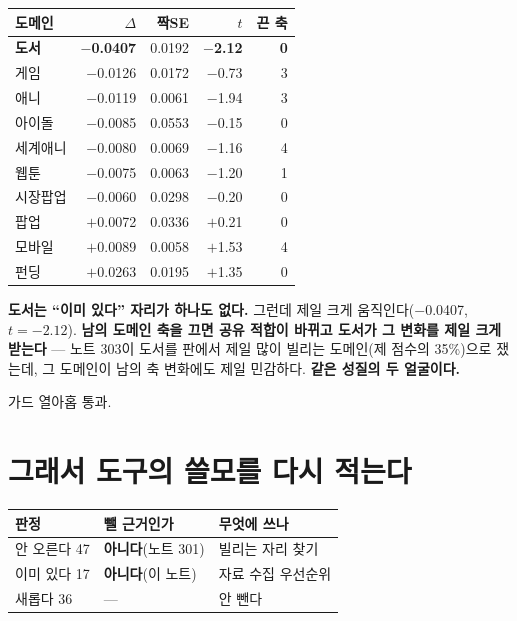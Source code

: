 \documentclass[10pt]{article}
\begin{document}
\begin{center}\footnotesize
\begin{tabular}{lrrrr}
\hline
도메인 & $\Delta$ & 짝SE & $t$ & 끈 축 \\
\hline
\textbf{도서} & \textbf{$-$0.0407} & 0.0192 & \textbf{$-$2.12} & \textbf{0} \\
게임 & $-$0.0126 & 0.0172 & $-$0.73 & 3 \\
애니 & $-$0.0119 & 0.0061 & $-$1.94 & 3 \\
아이돌 & $-$0.0085 & 0.0553 & $-$0.15 & 0 \\
세계애니 & $-$0.0080 & 0.0069 & $-$1.16 & 4 \\
웹툰 & $-$0.0075 & 0.0063 & $-$1.20 & 1 \\
시장팝업 & $-$0.0060 & 0.0298 & $-$0.20 & 0 \\
팝업 & $+$0.0072 & 0.0336 & $+$0.21 & 0 \\
모바일 & $+$0.0089 & 0.0058 & $+$1.53 & 4 \\
펀딩 & $+$0.0263 & 0.0195 & $+$1.35 & 0 \\
\hline
\end{tabular}
\end{center}

\textbf{도서는 ``이미 있다'' 자리가 하나도 없다.} 그런데 제일 크게
움직인다($-$0.0407, $t{=}{-}2.12$). \textbf{남의 도메인 축을 끄면 공유 적합이
바뀌고 도서가 그 변화를 제일 크게 받는다} --- 노트 303이 도서를 판에서 제일
많이 빌리는 도메인(제 점수의 35\%)으로 쟀는데, 그 도메인이 남의 축 변화에도
제일 민감하다. \textbf{같은 성질의 두 얼굴이다.}

가드 열아홉 통과.

\section{그래서 도구의 쓸모를 다시 적는다}

\begin{center}\footnotesize
\begin{tabular}{lll}
\hline
판정 & 뺄 근거인가 & 무엇에 쓰나 \\
\hline
안 오른다 47 & \textbf{아니다}(노트 301) & 빌리는 자리 찾기 \\
이미 있다 17 & \textbf{아니다}(이 노트) & 자료 수집 우선순위 \\
새롭다 36 & --- & 안 뺀다 \\
\hline
\end{tabular}
\end{center}
\end{document}
